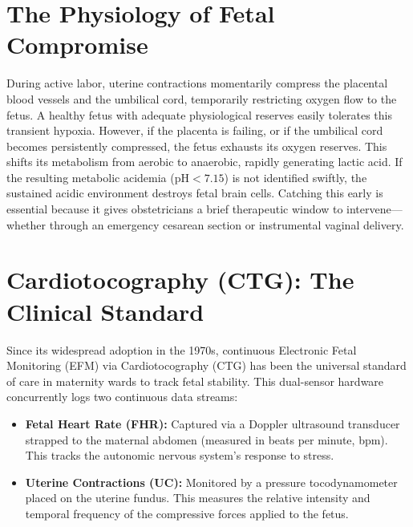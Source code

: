 \documentclass[12pt,a4paper]{report}
\begin{document}
\section{The Physiology of Fetal Compromise}
During active labor, uterine contractions momentarily compress the placental blood vessels and the umbilical cord, temporarily restricting oxygen flow to the fetus. A healthy fetus with adequate physiological reserves easily tolerates this transient hypoxia. However, if the placenta is failing, or if the umbilical cord becomes persistently compressed, the fetus exhausts its oxygen reserves. This shifts its metabolism from aerobic to anaerobic, rapidly generating lactic acid. If the resulting metabolic acidemia ($\text{pH} < 7.15$) is not identified swiftly, the sustained acidic environment destroys fetal brain cells. Catching this early is essential because it gives obstetricians a brief therapeutic window to intervene---whether through an emergency cesarean section or instrumental vaginal delivery.

\section{Cardiotocography (CTG): The Clinical Standard}
Since its widespread adoption in the 1970s, continuous Electronic Fetal Monitoring (EFM) via Cardiotocography (CTG) has been the universal standard of care in maternity wards to track fetal stability. This dual-sensor hardware concurrently logs two continuous data streams:
\begin{itemize}
    \item \textbf{Fetal Heart Rate (FHR):} Captured via a Doppler ultrasound transducer strapped to the maternal abdomen (measured in beats per minute, bpm). This tracks the autonomic nervous system's response to stress.
    \item \textbf{Uterine Contractions (UC):} Monitored by a pressure tocodynamometer placed on the uterine fundus. This measures the relative intensity and temporal frequency of the compressive forces applied to the fetus.
\end{itemize}
\end{document}
